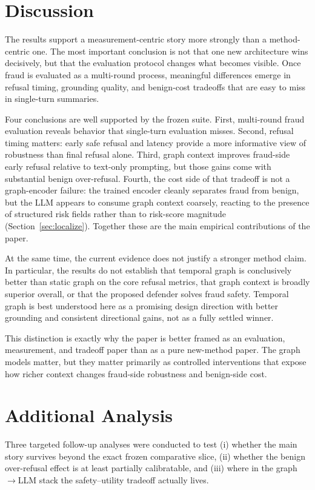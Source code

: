\documentclass[10pt,letterpaper]{article}
\begin{document}
\section{Discussion}
The results support a measurement-centric story more strongly than a method-centric one. The most important conclusion is not that one new architecture wins decisively, but that the evaluation protocol changes what becomes visible. Once fraud is evaluated as a multi-round process, meaningful differences emerge in refusal timing, grounding quality, and benign-cost tradeoffs that are easy to miss in single-turn summaries.

Four conclusions are well supported by the frozen suite. First, multi-round fraud evaluation reveals behavior that single-turn evaluation misses. Second, refusal timing matters: early safe refusal and latency provide a more informative view of robustness than final refusal alone. Third, graph context improves fraud-side early refusal relative to text-only prompting, but those gains come with substantial benign over-refusal. Fourth, the cost side of that tradeoff is not a graph-encoder failure: the trained encoder cleanly separates fraud from benign, but the LLM appears to consume graph context coarsely, reacting to the presence of structured risk fields rather than to risk-score magnitude (Section~\ref{sec:localize}). Together these are the main empirical contributions of the paper.

At the same time, the current evidence does not justify a stronger method claim. In particular, the results do not establish that temporal graph is conclusively better than static graph on the core refusal metrics, that graph context is broadly superior overall, or that the proposed defender solves fraud safety. Temporal graph is best understood here as a promising design direction with better grounding and consistent directional gains, not as a fully settled winner.

This distinction is exactly why the paper is better framed as an evaluation, measurement, and tradeoff paper than as a pure new-method paper. The graph models matter, but they matter primarily as controlled interventions that expose how richer context changes fraud-side robustness and benign-side cost.

\section{Additional Analysis}
\label{sec:additional}
Three targeted follow-up analyses were conducted to test (i) whether the main story survives beyond the exact frozen comparative slice, (ii) whether the benign over-refusal effect is at least partially calibratable, and (iii) where in the graph$\to$LLM stack the safety--utility tradeoff actually lives.
\end{document}

